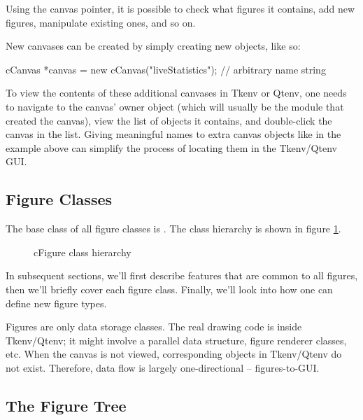 Using the canvas pointer, it is possible to check what figures it
contains, add new figures, manipulate existing ones, and so on.

New canvases can be created by simply creating new 
objects, like so:

\begin{cpp}
cCanvas *canvas = new cCanvas("liveStatistics"); // arbitrary name string
\end{cpp}

To view the contents of these additional canvases in Tkenv or Qtenv, one
needs to navigate to the canvas' owner object (which will usually be the
module that created the canvas), view the list of objects it contains, and
double-click the canvas in the list. Giving meaningful names to extra
canvas objects like in the example above can simplify the process of
locating them in the Tkenv/Qtenv GUI.


\subsection{Figure Classes}
\label{sec:graphics:figure-classes}

The base class of all figure classes is . The class hierarchy
is shown in figure \ref{fig:figure-inheritance}.

\begin{figure}[htbp]
  \begin{center}
    
    \caption{cFigure class hierarchy}
    \label{fig:figure-inheritance}
  \end{center}
\end{figure}

In subsequent sections, we'll first describe features that are common
to all figures, then we'll briefly cover each figure class. Finally,
we'll look into how one can define new figure types.

\begin{note}
Figures are only data storage classes. The real drawing code is inside
Tkenv/Qtenv; it might involve a parallel data structure, figure renderer
classes, etc. When the canvas is not viewed, corresponding objects in
Tkenv/Qtenv do not exist. Therefore, data flow is largely one-directional --
figures-to-GUI.
\end{note}


\subsection{The Figure Tree}
\label{sec:graphics:figure-tree}

